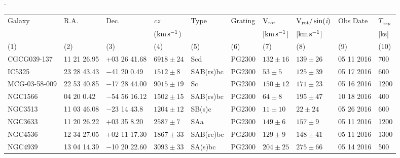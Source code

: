 \documentclass[iop]{emulateapj-rtx4}
\newcommand{\kms}{$\rm km\, s^{-1}$}
\begin{document}
\begin{table}[ht]\footnotesize. 
\begin{center}
\begin{tabular}{l l l l l l l l l l}
 \hline \hline
  Galaxy 		 	& R.A. 			& Dec. 		 	& \textit{cz}		& Type		& Grating		& $\rm V_{rot}$		& $\rm V_{rot} / \sin(\emph{i})$	& Obs Date	& $T_{exp}$		\\ 

  	    		 	& 	       			&	  		 	& (\kms)			& 		  	&			& [\kms]		     	& [\kms]				&			& [ks]			\\ 
 \scriptsize (1)  	 	& \scriptsize (2)		& \scriptsize (3) 	& \scriptsize (4)		& \scriptsize (5)	& \scriptsize (6)	& \scriptsize (7)		& \scriptsize (8)			& \scriptsize (9)	& \scriptsize (10)	\\ \hline \hline
 
 CGCG039-137 	& 11 21 26.95		& +03 26 41.68		& $6918 \pm24$	& Scd		& PG2300		& $132 \pm 16$	& $139 \pm 26$		& 05 11 2016	& 700			\\ %
 
 IC5325		 	& 23 28 43.43		& $-$41 20 0.49	& $1512 \pm8$		& SAB(rs)bc	& PG2300		& $53 \pm 5$		& $125 \pm 39$		& 05 17 2016	& 600			\\ %
 
 MCG-03-58-009	& 22 53 40.85		& $-$17 28 44.00	& $9015 \pm19$	& Sc			& PG2300		& $150 \pm 12$	& $171 \pm 23$		& 05 16 2016	& 1200			\\ %

 NGC1566		& 04 20 0.42		& $-$54 56 16.12	& $1502 \pm15$	& SAB(rs)bc	& PG2300		& $64 \pm 8$		& $195 \pm 47$		& 10 18 2016	& 400			\\ %

 NGC3513		& 11 03 46.08		& $-$23 14 43.8	& $1204 \pm12$	& SB(s)c		& PG2300		& $11 \pm 10$		& $22 \pm 24$			& 05 26 2016	& 600			\\ %
 
 NGC3633	 	& 11 20 26.22		& +03 35 8.20		& $2587 \pm7$		& SAa		& PG2300		& $149 \pm 6$		& $157 \pm 9$			& 05 11 2016	& 1200			\\ %

 NGC4536	 	& 12 34 27.05		& +02 11 17.30		& $1867 \pm33$	& SAB(rc)bc	& PG2300		& $129 \pm 9$		& $148 \pm 41$		& 05 11 2016	& 1300			\\ %

 NGC4939		& 13 04 14.39		& $-$10 20 22.60	& $3093 \pm33$	& SA(s)bc		& PG2300		& $204 \pm 25$	& $275 \pm 66$		& 05 14 2016	& 500			\\ %


\end{tabular}
\end{center}
\end{table}
\end{document}
